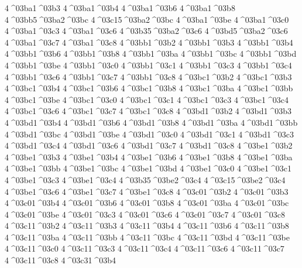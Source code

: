 {4^^^^03ba1^^^^03b3
4^^^^03ba1^^^^03b4
4^^^^03ba1^^^^03b6
4^^^^03ba1^^^^03b8
4^^^^03bb5^^^^03ba2^^^^03bc %
4^^^^03c15^^^^03ba2^^^^03bc %
4^^^^03ba1^^^^03be
4^^^^03ba1^^^^03c0
4^^^^03ba1^^^^03c3
4^^^^03ba1^^^^03c6
4^^^^03b35^^^^03ba2^^^^03c6 %
4^^^^03bd5^^^^03ba2^^^^03c6 %
4^^^^03ba1^^^^03c7
4^^^^03ba1^^^^03c8
4^^^^03bb1^^^^03b2
4^^^^03bb1^^^^03b3
4^^^^03bb1^^^^03b4
4^^^^03bb1^^^^03b6
4^^^^03bb1^^^^03b8
4^^^^03bb1^^^^03ba
4^^^^03bb1^^^^03bc
4^^^^03bb1^^^^03bd
4^^^^03bb1^^^^03be
4^^^^03bb1^^^^03c0
4^^^^03bb1^^^^03c1
4^^^^03bb1^^^^03c3
4^^^^03bb1^^^^03c4
4^^^^03bb1^^^^03c6
4^^^^03bb1^^^^03c7
4^^^^03bb1^^^^03c8
4^^^^03bc1^^^^03b2
4^^^^03bc1^^^^03b3
4^^^^03bc1^^^^03b4
4^^^^03bc1^^^^03b6
4^^^^03bc1^^^^03b8
4^^^^03bc1^^^^03ba
4^^^^03bc1^^^^03bb
4^^^^03bc1^^^^03be
4^^^^03bc1^^^^03c0
4^^^^03bc1^^^^03c1
4^^^^03bc1^^^^03c3
4^^^^03bc1^^^^03c4
4^^^^03bc1^^^^03c6
4^^^^03bc1^^^^03c7
4^^^^03bc1^^^^03c8
4^^^^03bd1^^^^03b2
4^^^^03bd1^^^^03b3
4^^^^03bd1^^^^03b4
4^^^^03bd1^^^^03b6
4^^^^03bd1^^^^03b8
4^^^^03bd1^^^^03ba
4^^^^03bd1^^^^03bb
4^^^^03bd1^^^^03bc
4^^^^03bd1^^^^03be
4^^^^03bd1^^^^03c0
4^^^^03bd1^^^^03c1
4^^^^03bd1^^^^03c3
4^^^^03bd1^^^^03c4
4^^^^03bd1^^^^03c6
4^^^^03bd1^^^^03c7
4^^^^03bd1^^^^03c8
4^^^^03be1^^^^03b2
4^^^^03be1^^^^03b3
4^^^^03be1^^^^03b4
4^^^^03be1^^^^03b6
4^^^^03be1^^^^03b8
4^^^^03be1^^^^03ba
4^^^^03be1^^^^03bb
4^^^^03be1^^^^03bc
4^^^^03be1^^^^03bd
4^^^^03be1^^^^03c0
4^^^^03be1^^^^03c1
4^^^^03be1^^^^03c3
4^^^^03be1^^^^03c4
4^^^^03b35^^^^03be2^^^^03c4 %
4^^^^03c15^^^^03be2^^^^03c4 %
4^^^^03be1^^^^03c6
4^^^^03be1^^^^03c7
4^^^^03be1^^^^03c8
4^^^^03c01^^^^03b2
4^^^^03c01^^^^03b3
4^^^^03c01^^^^03b4
4^^^^03c01^^^^03b6
4^^^^03c01^^^^03b8
4^^^^03c01^^^^03ba
4^^^^03c01^^^^03bc
4^^^^03c01^^^^03be
4^^^^03c01^^^^03c3
4^^^^03c01^^^^03c6
4^^^^03c01^^^^03c7
4^^^^03c01^^^^03c8
4^^^^03c11^^^^03b2
4^^^^03c11^^^^03b3
4^^^^03c11^^^^03b4
4^^^^03c11^^^^03b6
4^^^^03c11^^^^03b8
4^^^^03c11^^^^03ba
4^^^^03c11^^^^03bb
4^^^^03c11^^^^03bc
4^^^^03c11^^^^03bd
4^^^^03c11^^^^03be
4^^^^03c11^^^^03c0
4^^^^03c11^^^^03c3
4^^^^03c11^^^^03c4
4^^^^03c11^^^^03c6
4^^^^03c11^^^^03c7
4^^^^03c11^^^^03c8
4^^^^03c31^^^^03b4 %
}
